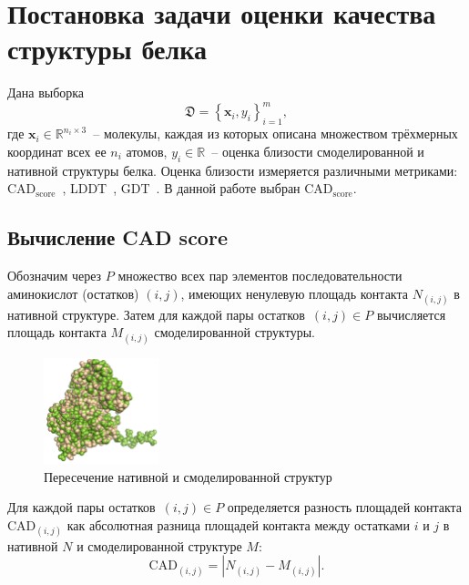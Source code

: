 \documentclass[14pt]{extarticle}
\begin{document}
\section{Постановка задачи оценки качества структуры белка}

Дана выборка $$\mathfrak{D} = \left\{\mathbf{x}_i, {y}_i\right\}_{i=1}^m,$$ где $\mathbf{x}_i\in \mathbb{R}^{n_i\times 3}$~-- молекулы, каждая из которых описана множеством трёхмерных координат всех ее $n_i$ атомов, ${y}_i \in \mathbb{R}$~-- оценка близости смоделированной и нативной структуры белка. Оценка близости измеряется различными метриками: $\text{CAD}_\text{score}$~\cite{Olechnovic2013CADscoreAN}, LDDT~\cite{Mariani2013lDDTAL}, GDT~\cite{GDT}. В данной работе выбран $\text{CAD}_\text{score}$. 

\subsection{Вычисление CAD score}

Обозначим через $P$ множество всех пар элементов последовательности аминокислот (остатков)  $(i, j)$, имеющих ненулевую площадь контакта $N_{(i, j)}$ в нативной структуре. Затем для каждой пары остатков~$(i, j) \in P$ вычисляется площадь контакта $M_{(i, j)}$ смоделированной структуры. 

\begin{figure}[h]
	\centering
	\includegraphics[width=0.3\textwidth]{T0861_Atome2_CBS_TS4.pdf}
	\caption{Пересечение нативной и смоделированной структур}
	\label{CAD_example}
\end{figure}

Для каждой пары остатков~$(i, j) \in P$ определяется разность площадей контакта $\mathrm{CAD}_{(i, j)}$ как абсолютная разница площадей контакта между остатками $i$ и $j$ в нативной $N$ и смоделированной структуре $M$:
$$\mathrm{CAD}_{(i, j)}=\left|N_{(i, j)}-M_{(i, j)}\right|.$$
\end{document}
